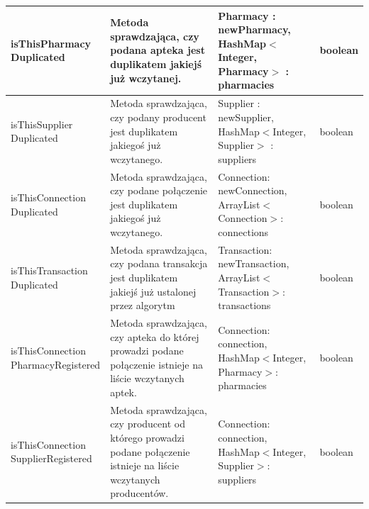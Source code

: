 \documentclass[a4paper]{article}
\begin{document}
{\begin{tabular}{| p{3.5cm} | p{5cm} | p{4cm} | m{2cm} |}
\parbox[t]{3cm}{isThisPharmacy\\Duplicated} & 
\parbox[t]{5cm}{Metoda sprawdzająca, czy podana apteka jest duplikatem jakiejś już wczytanej.} & 
\parbox[t]{4cm}{Pharmacy : newPharmacy,\\ HashMap$<$Integer, Pharmacy$>$ : pharmacies} &
\parbox[t]{2cm}{boolean} \\ \hline

\parbox[t]{3cm}{isThisSupplier\\Duplicated} & 
\parbox[t]{5cm}{Metoda sprawdzająca, czy podany producent jest duplikatem jakiegoś już wczytanego.} & 
\parbox[t]{4cm}{Supplier : newSupplier,\\ HashMap$<$Integer, Supplier$>$ : suppliers} &
\parbox[t]{2cm}{boolean} \\ \hline

\parbox[t]{3cm}{isThisConnection\\Duplicated} & 
\parbox[t]{5cm}{Metoda sprawdzająca, czy podane połączenie jest duplikatem jakiegoś już wczytanego.} & 
\parbox[t]{4cm}{Connection: newConnection,\\ ArrayList$<$Connection$>$: connections} &
\parbox[t]{2cm}{boolean} \\ \hline

\parbox[t]{3cm}{isThisTransaction\\Duplicated} & 
\parbox[t]{5cm}{Metoda sprawdzająca, czy podana transakcja jest duplikatem jakiejś już ustalonej przez algorytm} & 
\parbox[t]{4cm}{Transaction: newTransaction,\\ ArrayList$<$Transaction$>$: transactions} &
\parbox[t]{2cm}{boolean} \\ \hline

\parbox[t]{3cm}{isThisConnection\\PharmacyRegistered} & 
\parbox[t]{5cm}{Metoda sprawdzająca, czy apteka do której prowadzi podane połączenie istnieje na liście wczytanych aptek.} & 
\parbox[t]{4cm}{Connection: connection,\\HashMap$<$Integer, Pharmacy$>$: pharmacies} &
\parbox[t]{2cm}{boolean} \\ \hline

\parbox[t]{3cm}{isThisConnection\\SupplierRegistered} & 
\parbox[t]{5cm}{Metoda sprawdzająca, czy producent od którego prowadzi podane połączenie istnieje na liście wczytanych producentów.} & 
\parbox[t]{4cm}{Connection: connection,\\HashMap$<$Integer, Supplier$>$: suppliers} &
\parbox[t]{2cm}{boolean} \\ \hline
\end{tabular}
}
\newpage
\end{document}
